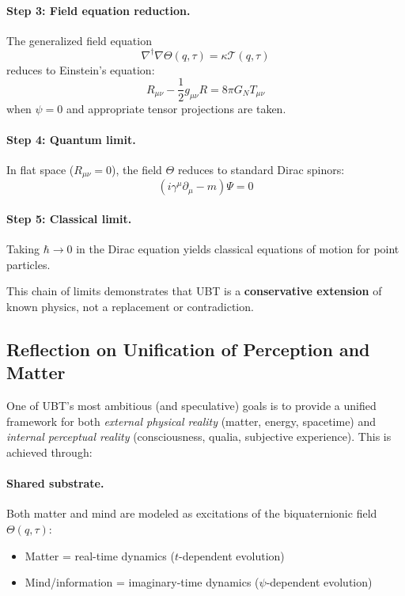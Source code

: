\paragraph{Step 3: Field equation reduction.} The generalized field equation
\begin{equation}
\nabla^\dagger \nabla \Theta(q,\tau) = \kappa \mathcal{T}(q,\tau)
\end{equation}
reduces to Einstein's equation:
\begin{equation}
R_{\mu\nu} - \frac{1}{2}g_{\mu\nu}R = 8\pi G_N T_{\mu\nu}
\end{equation}
when $\psi = 0$ and appropriate tensor projections are taken.

\paragraph{Step 4: Quantum limit.} In flat space ($R_{\mu\nu} = 0$), the field $\Theta$ reduces to standard Dirac spinors:
\begin{equation}
(i\gamma^\mu \partial_\mu - m)\Psi = 0
\end{equation}

\paragraph{Step 5: Classical limit.} Taking $\hbar \to 0$ in the Dirac equation yields classical equations of motion for point particles.

This chain of limits demonstrates that UBT is a \textbf{conservative extension} of known physics, not a replacement or contradiction.

\subsection{Reflection on Unification of Perception and Matter}

One of UBT's most ambitious (and speculative) goals is to provide a unified framework for both \emph{external physical reality} (matter, energy, spacetime) and \emph{internal perceptual reality} (consciousness, qualia, subjective experience). This is achieved through:

\paragraph{Shared substrate.} Both matter and mind are modeled as excitations of the biquaternionic field $\Theta(q,\tau)$:
\begin{itemize}
\item Matter = real-time dynamics ($t$-dependent evolution)
\item Mind/information = imaginary-time dynamics ($\psi$-dependent evolution)
\end{itemize}

